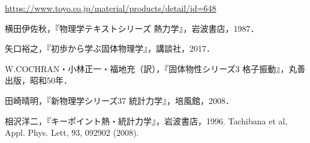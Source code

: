 \documentclass[10pt,b5paper,papersize,dvipdfmx]{jsbook}
\begin{document}
\begin{thebibliography}{99}
   \url{https://www.toyo.co.jp/material/products/detail/id=648}
  \item 横田伊佐秋，『物理学テキストシリーズ 熱力学』，岩波書店，1987．
  \item 矢口裕之，『初歩から学ぶ固体物理学』，講談社，2017．
  \item W.COCHRAN・小林正一・福地充（訳），『固体物性シリーズ3 格子振動』，丸善出版，昭和50年．
  \item 田崎晴明，『新物理学シリーズ37 統計力学』，培風館，2008．
  \item 相沢洋二，『キーポイント熱・統計力学』，岩波書店，1996.
  Tachibana et al, Appl. Phys. Lett, 93, 092902 (2008).
\end{thebibliography}
\end{document}
